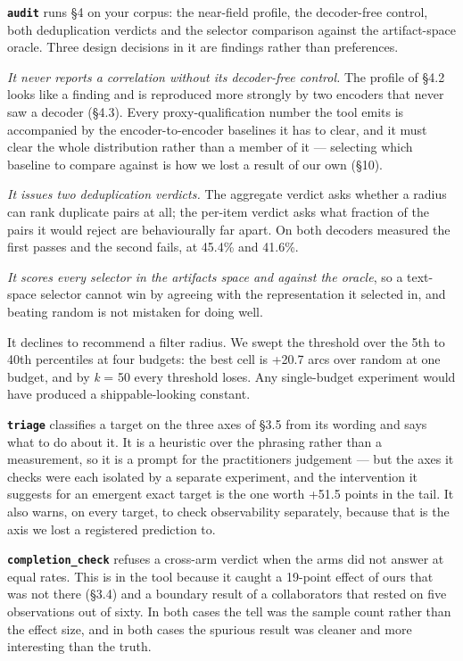 \documentclass[
  10pt,
]{article}
\theoremstyle{plain}
\theoremstyle{definition}
\begin{document}
\textbf{\texttt{audit}} runs §4 on your corpus: the near-field profile,
the decoder-free control, both deduplication verdicts and the selector
comparison against the artifact-space oracle. Three design decisions in
it are findings rather than preferences.

\emph{It never reports a correlation without its decoder-free control.}
The profile of §4.2 looks like a finding and is reproduced more strongly
by two encoders that never saw a decoder (§4.3). Every
proxy-qualification number the tool emits is accompanied by the
encoder-to-encoder baselines it has to clear, and it must clear the
whole distribution rather than a member of it --- selecting which
baseline to compare against is how we lost a result of our own (§10).

\emph{It issues two deduplication verdicts.} The aggregate verdict asks
whether a radius can rank duplicate pairs at all; the per-item verdict
asks what fraction of the pairs it would reject are behaviourally far
apart. On both decoders measured the first passes and the second fails,
at 45.4\% and 41.6\%.

\emph{It scores every selector in the artifact\textquotesingle s space
and against the oracle}, so a text-space selector cannot win by agreeing
with the representation it selected in, and beating random is not
mistaken for doing well.

It declines to recommend a filter radius. We swept the threshold over
the 5th to 40th percentiles at four budgets: the best cell is +20.7 arcs
over random at one budget, and by \emph{k} = 50 every threshold loses.
Any single-budget experiment would have produced a shippable-looking
constant.

\textbf{\texttt{triage}} classifies a target on the three axes of §3.5
from its wording and says what to do about it. It is a heuristic over
the phrasing rather than a measurement, so it is a prompt for the
practitioner\textquotesingle s judgement --- but the axes it checks were
each isolated by a separate experiment, and the intervention it suggests
for an emergent exact target is the one worth +51.5 points in the tail.
It also warns, on every target, to check observability separately,
because that is the axis we lost a registered prediction to.

\textbf{\texttt{completion\_check}} refuses a cross-arm verdict when the
arms did not answer at equal rates. This is in the tool because it
caught a 19-point effect of ours that was not there (§3.4) and a
boundary result of a collaborator\textquotesingle s that rested on five
observations out of sixty. In both cases the tell was the sample count
rather than the effect size, and in both cases the spurious result was
cleaner and more interesting than the truth.
\end{document}
